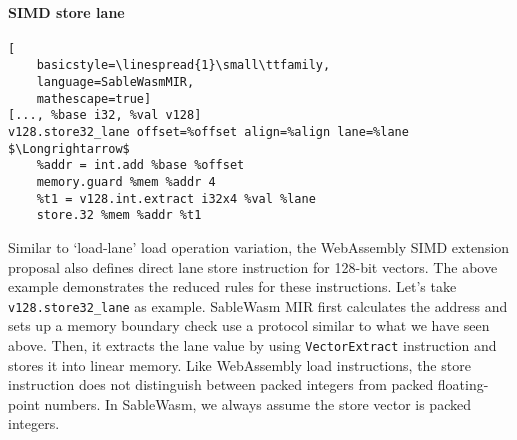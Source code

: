 \paragraph{SIMD store lane} \quad
\begin{lstlisting}[
    basicstyle=\linespread{1}\small\ttfamily, 
    language=SableWasmMIR, 
    mathescape=true]
[..., %base i32, %val v128]
v128.store32_lane offset=%offset align=%align lane=%lane $\Longrightarrow$
    %addr = int.add %base %offset
    memory.guard %mem %addr 4
    %t1 = v128.int.extract i32x4 %val %lane
    store.32 %mem %addr %t1
\end{lstlisting}
Similar to `load-lane' load operation variation, the WebAssembly SIMD extension
proposal also defines direct lane store instruction for 128-bit vectors. The
above example demonstrates the reduced rules for these instructions. Let's take
\texttt{v128.store32\_lane} as example. SableWasm MIR first calculates the
address and sets up a memory boundary check use a protocol similar to what we
have seen above. Then, it extracts the lane value by using
\texttt{VectorExtract} instruction and stores it into linear memory. Like
WebAssembly load instructions, the store instruction does not distinguish
between packed integers from packed floating-point numbers. In SableWasm, we
always assume the store vector is packed integers.
